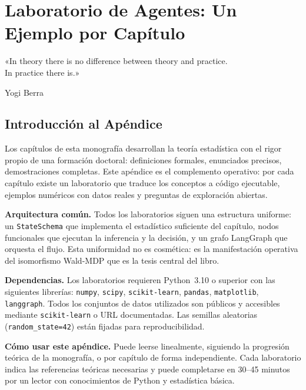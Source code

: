 
\chapter{Laboratorio de Agentes: Un Ejemplo por Capítulo}
\label{app:laboratorio}

\epigraph{«In theory there is no difference between theory and practice.\\
In practice there is.»}{Yogi Berra}

\section*{Introducción al Apéndice}

Los capítulos de esta monografía desarrollan la teoría estadística con el
rigor propio de una formación doctoral: definiciones formales, enunciados
precisos, demostraciones completas. Este apéndice es el complemento
operativo: por cada capítulo existe un laboratorio que traduce los conceptos
a código ejecutable, ejemplos numéricos con datos reales y preguntas de
exploración abiertas.

\textbf{Arquitectura común.} Todos los laboratorios siguen una estructura
uniforme: un \texttt{StateSchema} que implementa el estadístico suficiente
del capítulo, nodos funcionales que ejecutan la inferencia y la decisión, y
un grafo LangGraph que orquesta el flujo. Esta uniformidad no es cosmética:
es la manifestación operativa del isomorfismo Wald-MDP que es la tesis
central del libro.

\textbf{Dependencias.} Los laboratorios requieren Python~3.10 o superior con
las siguientes librerías: \texttt{numpy}, \texttt{scipy}, \texttt{scikit-learn},
\texttt{pandas}, \texttt{matplotlib}, \texttt{langgraph}. Todos los conjuntos
de datos utilizados son públicos y accesibles mediante \texttt{scikit-learn}
o URL documentadas. Las semillas aleatorias (\texttt{random\_state=42}) están
fijadas para reproducibilidad.

\textbf{Cómo usar este apéndice.} Puede leerse linealmente, siguiendo la
progresión teórica de la monografía, o por capítulo de forma independiente.
Cada laboratorio indica las referencias teóricas necesarias y puede
completarse en 30--45 minutos por un lector con conocimientos de Python
y estadística básica.

